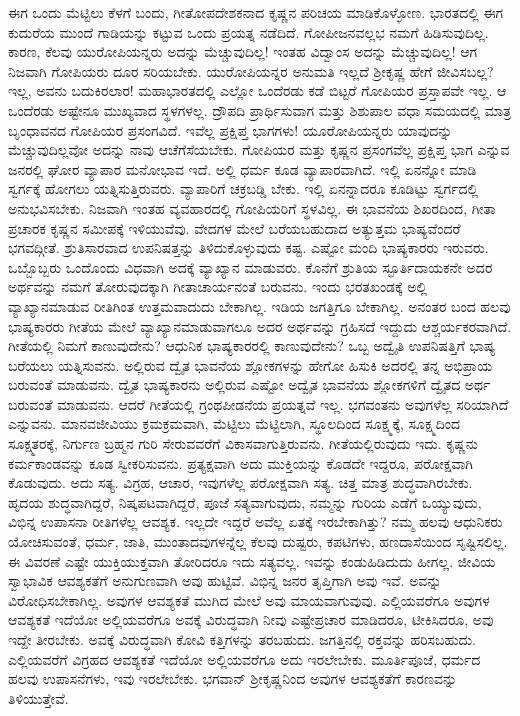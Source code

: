 ಈಗ ಒಂದು ಮೆಟ್ಟಿಲು ಕೆಳಗೆ ಬಂದು, ಗೀತೋಪದೇಶಕನಾದ ಕೃಷ್ಣನ ಪರಿಚಯ ಮಾಡಿಕೊಳ್ಳೋಣ. ಭಾರತದಲ್ಲಿ ಈಗ ಕುದುರೆಯ ಮುಂದೆ ಗಾಡಿಯನ್ನು ಕಟ್ಟುವ ಒಂದು ಪ್ರಯತ್ನ ನಡೆದಿದೆ. ಗೋಪೀಜನವಲ್ಲಭ ನಮಗೆ ಹಿಡಿಸುವುದಿಲ್ಲ. ಕಾರಣ, ಕೆಲವು ಯುರೋಪಿಯನ್ನರು ಅದನ್ನು ಮೆಚ್ಚುವುದಿಲ್ಲ! ಇಂತಹ ವಿದ್ವಾಂಸ ಅದನ್ನು ಮೆಚ್ಚುವುದಿಲ್ಲ! ಆಗ ನಿಜವಾಗಿ ಗೋಪಿಯರು ದೂರ ಸರಿಯಬೇಕು. ಯುರೋಪಿಯನ್ನರ ಅನುಮತಿ ಇಲ್ಲದೆ ಶ‍್ರೀಕೃಷ್ಣ ಹೇಗೆ ಜೀವಿಸಬಲ್ಲ? ಇಲ್ಲ, ಅವನು ಬದುಕಿರಲಾರ! ಮಹಾಭಾರತದಲ್ಲಿ ಎಲ್ಲೋ ಒಂದೆರಡು ಕಡೆ ಬಿಟ್ಟರೆ ಗೋಪಿಯರ ಪ್ರಸ್ತಾಪವೇ ಇಲ್ಲ. ಆ ಒಂದೆರಡು ಅಷ್ಟೇನೂ ಮುಖ್ಯವಾದ ಸ್ಥಳಗಳಲ್ಲ. ದ್ರೌಪದಿ ಪ್ರಾರ್ಥಿಸುವಾಗ ಮತ್ತು ಶಿಶುಪಾಲ ವಧಾ ಸಮಯದಲ್ಲಿ ಮಾತ್ರ ಬೃಂಧಾವನದ ಗೋಪಿಯರ ಪ್ರಸಂಗವಿದೆ. ಇವೆಲ್ಲ ಪ್ರಕ್ಷಿಪ್ತ ಭಾಗಗಳು! ಯೂರೋಪಿಯನ್ನರು ಯಾವುದನ್ನು ಮೆಚ್ಚುವುದಿಲ್ಲವೋ ಅದನ್ನು ನಾವು ಆಚೆಗೆಸೆಯಬೇಕು. ಗೋಪಿಯರ ಮತ್ತು ಕೃಷ್ಣನ ಪ್ರಸಂಗವೆಲ್ಲ ಪ್ರಕ್ಷಿಪ್ತ ಭಾಗ ಎನ್ನುವ ಜನರಲ್ಲಿ ಘೋರ ವ್ಯಾಪಾರ ಮನೋಭಾವ ಇದೆ. ಅಲ್ಲಿ ಧರ್ಮ ಕೂಡ ವ್ಯಾಪಾರವಾಗಿದೆ. ಇಲ್ಲಿ ಏನನ್ನೋ ಮಾಡಿ ಸ್ವರ್ಗಕ್ಕೆ ಹೋಗಲು ಯತ್ನಿಸುತ್ತಿರುವರು. ವ್ಯಾಪಾರಿಗೆ ಚಕ್ರಬಡ್ಡಿ ಬೇಕು. ಇಲ್ಲಿ ಏನನ್ನಾದರೂ ಕೂಡಿಟ್ಟು ಸ್ವರ್ಗದಲ್ಲಿ ಅನುಭವಿಸಬೇಕು. ನಿಜವಾಗಿ ಇಂತಹ ವ್ಯವಹಾರದಲ್ಲಿ ಗೋಪಿಯರಿಗೆ ಸ್ಥಳವಿಲ್ಲ. ಈ ಭಾವನೆಯ ಶಿಖರದಿಂದ, ಗೀತಾ ಪ್ರಚಾರಕ ಕೃಷ್ಣನ ಸಮೀಪಕ್ಕೆ ಇಳಿಯುವೆವು. ವೇದಗಳ ಮೇಲೆ ಬರೆಯಬಹುದಾದ ಅತ್ಯುತ್ತಮ ಭಾಷ್ಯವೆಂದರೆ ಭಗವದ್ಗೀತೆ. ಶ್ರುತಿಸಾರವಾದ ಉಪನಿಷತ್ತನ್ನು ತಿಳಿದುಕೊಳ್ಳುವುದು ಕಷ್ಟ. ಎಷ್ಟೋ ಮಂದಿ ಭಾಷ್ಯಕಾರರು ಇರುವರು. ಒಬ್ಬೊಬ್ಬರು ಒಂದೊಂದು ವಿಧವಾಗಿ ಅದಕ್ಕೆ ವ್ಯಾಖ್ಯಾನ ಮಾಡುವರು. ಕೊನೆಗೆ ಶ್ರುತಿಯ ಸ್ಫೂರ್ತಿದಾಯಕನೇ ಅದರ ಅರ್ಥವನ್ನು ನಮಗೆ ತೋರುವುದಕ್ಕಾಗಿ ಗೀತಾಚಾರ್ಯನಂತೆ ಬರುವನು. ಇಂದು ಭರತಖಂಡಕ್ಕೆ ಅಲ್ಲಿ ವ್ಯಾಖ್ಯಾನಮಾಡುವ ರೀತಿಗಿಂತ ಉತ್ತಮವಾದುದು ಬೇಕಾಗಿಲ್ಲ. ಇಡಿಯ ಜಗತ್ತಿಗೂ ಬೇಕಾಗಿಲ್ಲ. ಅನಂತರ ಬಂದ ಹಲವು ಭಾಷ್ಯಕಾರರು ಗೀತೆಯ ಮೇಲೆ ವ್ಯಾಖ್ಯಾನಮಾಡುವಾಗಲೂ ಅದರ ಅರ್ಥವನ್ನು ಗ್ರಹಿಸದೆ ಇದ್ದುದು ಆಶ್ಚರ್ಯಕರವಾಗಿದೆ. ಗೀತೆಯಲ್ಲಿ ನಿಮಗೆ ಕಾಣುವುದೇನು? ಆಧುನಿಕ ಭಾಷ್ಯಕಾರರಲ್ಲಿ ಕಾಣುವುದೇನು? ಒಬ್ಬ ಅದ್ವೈತಿ ಉಪನಿಷತ್ತಿಗೆ ಭಾಷ್ಯ ಬರೆಯಲು ಯತ್ನಿಸುವನು. ಅಲ್ಲಿರುವ ದ್ವೈತ ಭಾವನೆಯ ಶ್ಲೋಕಗಳನ್ನು ಹೇಗೋ ಹಿಸುಕಿ ಅದರಲ್ಲಿ ತನ್ನ ಅಭಿಪ್ರಾಯ ಬರುವಂತೆ ಮಾಡುವನು. ದ್ವೈತ ಭಾಷ್ಯಕಾರನು ಅಲ್ಲಿರುವ ಎಷ್ಟೋ ಅದ್ವೈತ ಭಾವನೆಯ ಶ್ಲೋಕಗಳಿಗೆ ದ್ವೈತದ ಅರ್ಥ ಬರುವಂತೆ ಮಾಡುವನು. ಆದರೆ ಗೀತೆಯಲ್ಲಿ ಗ್ರಂಥಪೀಡನೆಯ ಪ್ರಯತ್ನವೆ ಇಲ್ಲ. ಭಗವಂತನು ಅವುಗಳೆಲ್ಲ ಸರಿಯಾಗಿದೆ ಎನ್ನುವನು. ಮಾನವಜೀವಿಯು ಕ್ರಮಕ್ರಮವಾಗಿ, ಮೆಟ್ಟಿಲು ಮೆಟ್ಟಿಲಾಗಿ, ಸ್ಥೂಲದಿಂದ ಸೂಕ್ಷ್ಮಕ್ಕೆ, ಸೂಕ್ಷ್ಮದಿಂದ ಸೂಕ್ಷ್ಮತರಕ್ಕೆ, ನಿರ್ಗುಣ ಬ್ರಹ್ಮನ ಗುರಿ ಸೇರುವವರೆಗೆ ವಿಕಾಸವಾಗುತ್ತಿರುವನು. ಗೀತೆಯಲ್ಲಿರುವುದು ಇದು. ಕೃಷ್ಣನು ಕರ್ಮಕಾಂಡವನ್ನು ಕೂಡ ಸ್ವೀಕರಿಸುವನು. ಪ್ರತ್ಯಕ್ಷವಾಗಿ ಅದು ಮುಕ್ತಿಯನ್ನು ಕೊಡದೇ ಇದ್ದರೂ, ಪರೋಕ್ಷವಾಗಿ ಕೊಡುವುದು. ಅದು ಸತ್ಯ. ವಿಗ್ರಹ, ಆಚಾರ, ಇವುಗಳೆಲ್ಲ ಪರೋಕ್ಷವಾಗಿ ಸತ್ಯ. ಚಿತ್ತ ಮಾತ್ರ ಶುದ್ಧವಾಗಿರಬೇಕು. ಹೃದಯ ಶುದ್ಧವಾಗಿದ್ದರೆ, ನಿಷ್ಕಪಟವಾಗಿದ್ದರೆ, ಪೂಜೆ ಸತ್ಯವಾಗುವುದು, ನಮ್ಮನ್ನು ಗುರಿಯ ಎಡೆಗೆ ಒಯ್ಯುವುದು, ವಿಭಿನ್ನ ಉಪಾಸನಾ ರೀತಿಗಳೆಲ್ಲ ಆವಶ್ಯಕ. ಇಲ್ಲದೇ ಇದ್ದರೆ ಅವೆಲ್ಲ ಏತಕ್ಕೆ ಇರಬೇಕಾಗಿತ್ತು? ನಮ್ಮ ಹಲವು ಆಧುನಿಕರು ಯೋಚಿಸುವಂತೆ, ಧರ್ಮ, ಜಾತಿ, ಮುಂತಾದವುಗಳನ್ನೆಲ್ಲ ಕೆಲವು ದುಷ್ಟರು, ಕಪಟಿಗಳು, ಹಣದಾಸೆಯಿಂದ ಸೃಷ್ಟಿಸಲಿಲ್ಲ. ಈ ವಿವರಣೆ ಎಷ್ಟೇ ಯುಕ್ತಿಯುಕ್ತವಾಗಿ ತೋರಿದರೂ ಇದು ಸತ್ಯವಲ್ಲ. ಇವನ್ನು ಕಂಡುಹಿಡಿದುದು ಹೀಗಲ್ಲ. ಜೀವಿಯ ಸ್ವಾಭಾವಿಕ ಆವಶ್ಯಕತೆಗೆ ಅನುಗುಣವಾಗಿ ಅವು ಹುಟ್ಟಿವೆ. ವಿಭಿನ್ನ ಜನರ ತೃಪ್ತಿಗಾಗಿ ಅವು ಇವೆ. ಅವನ್ನು ವಿರೋಧಿಸಬೇಕಾಗಿಲ್ಲ. ಅವುಗಳ ಆವಶ್ಯಕತೆ ಮುಗಿದ ಮೇಲೆ ಅವು ಮಾಯವಾಗುವುವು. ಎಲ್ಲಿಯವರೆಗೂ ಅವುಗಳ ಆವಶ್ಯಕತೆ ಇದೆಯೋ ಅಲ್ಲಿಯವರೆಗೂ ಅವಕ್ಕೆ ವಿರುದ್ಧವಾಗಿ ನೀವು ಎಷ್ಟೇಪ್ರಚಾರ ಮಾಡಿದರೂ, ಟೀಕಿಸಿದರೂ, ಅವು ಇದ್ದೇ ತೀರಬೇಕು. ಅವಕ್ಕೆ ವಿರುದ್ಧವಾಗಿ ಕೋವಿ ಕತ್ತಿಗಳನ್ನು ತರಬಹುದು. ಜಗತ್ತಿನಲ್ಲಿ ರಕ್ತವನ್ನು ಹರಿಸಬಹುದು. ಎಲ್ಲಿಯವರೆಗೆ ವಿಗ್ರಹದ ಆವಶ್ಯಕತೆ ಇದೆಯೋ ಅಲ್ಲಿಯವರೆಗೂ ಅದು ಇರಲೇಬೇಕು. ಮೂರ್ತಿಪೂಜೆ, ಧರ್ಮದ ಹಲವು ಉಪಾಸನೆಗಳು, ಇವು ಇರಲೇಬೇಕು. ಭಗವಾನ್​ ಶ‍್ರೀಕೃಷ್ಣನಿಂದ ಅವುಗಳ ಆವಶ್ಯಕತೆಗೆ ಕಾರಣವನ್ನು ತಿಳಿಯುತ್ತೇವೆ. 

